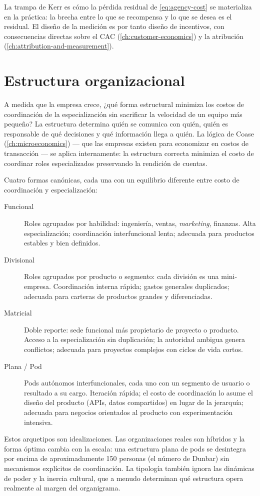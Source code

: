 La trampa de Kerr es cómo la pérdida residual de \cref{eq:agency-cost} se materializa en la práctica: la brecha entre lo que se recompensa y lo que se desea es el residual. El diseño de la medición es por tanto diseño de incentivos, con consecuencias directas sobre el CAC (\cref{ch:customer-economics}) y la atribución (\cref{ch:attribution-and-measurement}).

\section{Estructura organizacional}\label{sec:org-structure}

A medida que la empresa crece, ¿qué forma estructural minimiza los costos de coordinación de la especialización sin sacrificar la velocidad de un equipo más pequeño? La estructura determina quién se comunica con quién, quién es responsable de qué decisiones y qué información llega a quién. La lógica de Coase (\cref{ch:microeconomics}) --- que las empresas existen para economizar en costos de transacción --- se aplica internamente: la estructura correcta minimiza el costo de coordinar roles especializados preservando la rendición de cuentas.

Cuatro formas canónicas, cada una con un equilibrio diferente entre costo de coordinación y especialización:
\begin{description}
  \item[Funcional] Roles agrupados por habilidad: ingeniería, ventas, \emph{marketing}, finanzas. Alta especialización; coordinación interfuncional lenta; adecuada para productos estables y bien definidos.
  \item[Divisional] Roles agrupados por producto o segmento: cada división es una mini-empresa. Coordinación interna rápida; gastos generales duplicados; adecuada para carteras de productos grandes y diferenciadas.
  \item[Matricial] Doble reporte: sede funcional más propietario de proyecto o producto. Acceso a la especialización sin duplicación; la autoridad ambigua genera conflictos; adecuada para proyectos complejos con ciclos de vida cortos.
  \item[Plana / Pod] Pods autónomos interfuncionales, cada uno con un segmento de usuario o resultado a su cargo. Iteración rápida; el costo de coordinación lo asume el diseño del producto (APIs, datos compartidos) en lugar de la jerarquía; adecuada para negocios orientados al producto con experimentación intensiva.
\end{description}
Estos arquetipos son idealizaciones. Las organizaciones reales son híbridos y la forma óptima cambia con la escala: una estructura plana de pods se desintegra por encima de aproximadamente 150 personas (el número de Dunbar) sin mecanismos explícitos de coordinación. La tipología también ignora las dinámicas de poder y la inercia cultural, que a menudo determinan qué estructura opera realmente al margen del organigrama.

